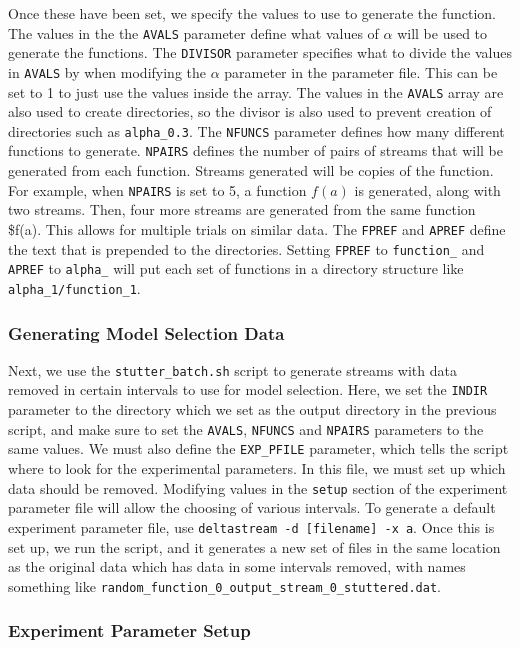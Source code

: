 \documentclass[a4paper,11pt]{article}
\begin{document}
\begin{appendices}
Once these have been set, we specify the values to use to generate the
function. The values in the the \texttt{AVALS} parameter define what values of
$\alpha$ will be used to generate the functions. The \texttt{DIVISOR} parameter
specifies what to divide the values in \texttt{AVALS} by when modifying the
$\alpha$ parameter in the parameter file. This can be set to 1 to just use the
values inside the array. The values in the \texttt{AVALS} array are also used to
create directories, so the divisor is also used to prevent creation of
directories such as \texttt{alpha\_0.3}. The \texttt{NFUNCS} parameter defines
how many different functions to generate. \texttt{NPAIRS} defines the number of
pairs of streams that will be generated from each function. Streams generated
will be copies of the function. For example, when \texttt{NPAIRS} is set to 5, a
function $f(a)$ is generated, along with two streams. Then, four more streams
are generated from the same function \$f(a). This allows for multiple trials on
similar data. The \texttt{FPREF} and \texttt{APREF} define the text that is
prepended to the directories. Setting \texttt{FPREF} to \texttt{function\_} and
\texttt{APREF} to \texttt{alpha\_} will put each set of functions in a directory
structure like \texttt{alpha\_1/function\_1}.
\subsubsection{Generating Model Selection Data}
\label{sec-10-2-2}

Next, we use the \texttt{stutter\_batch.sh} script to generate streams with data
removed in certain intervals to use for model selection. Here, we set the
\texttt{INDIR} parameter to the directory which we set as the output directory
in the previous script, and make sure to set the \texttt{AVALS}, \texttt{NFUNCS}
and \texttt{NPAIRS} parameters to the same values. We must also define the
\texttt{EXP\_PFILE} parameter, which tells the script where to look for the
experimental parameters. In this file, we must set up which data should be
removed. Modifying values in the \texttt{setup} section of the experiment
parameter file will allow the choosing of various intervals. To generate a
default experiment parameter file, use \texttt{deltastream -d [filename] -x
a}. Once this is set up, we run the script, and it generates a new set of files
in the same location as the original data which has data in some intervals
removed, with names something like \texttt{random\_function\_0\_output\_stream\_0\_stuttered.dat}.
\subsubsection{Experiment Parameter Setup}
\label{sec-10-2-3}


\end{appendices}
\end{document}
